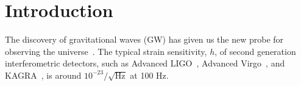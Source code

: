 \documentclass[%
 reprint,
superscriptaddress,
 amsmath,amssymb,
 aps,
]{revtex4-1}
\begin{document}
\maketitle


\section{Introduction}

The discovery of gravitational waves (GW) has given us the new probe for observing the universe~\cite{PhysRevLett.116.061102}. 
The typical strain sensitivity, $h$, of second generation interferometric detectors, such as Advanced LIGO~\cite{0264-9381-32-7-074001}, Advanced Virgo~\cite{0264-9381-32-2-024001}, and KAGRA~\cite{0264-9381-29-12-124007, PhysRevD.88.043007}, is around $10^{-23}/\sqrt{\mathrm{Hz}}$ at 100 Hz. 
\end{document}
